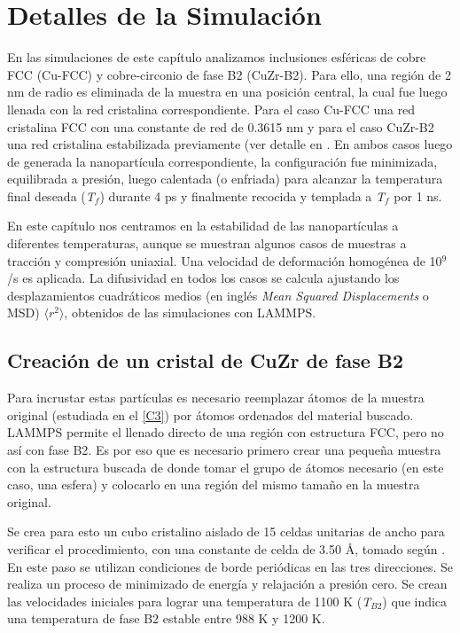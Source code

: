 
\section{Detalles de la Simulación}
\label{S4_1}

En las simulaciones de este capítulo analizamos inclusiones esféricas de cobre FCC (Cu-FCC) y cobre-circonio de fase B2 (CuZr-B2). Para ello, una región de 2 nm de radio es eliminada de la muestra en una posición central, la cual fue luego llenada con la red cristalina correspondiente. Para el caso Cu-FCC una red cristalina FCC con una constante de red de 0.3615 nm y para el caso CuZr-B2 una red cristalina estabilizada previamente (ver detalle en . En ambos casos luego de generada la nanopartícula correspondiente, la configuración fue minimizada, equilibrada a presión, luego calentada (o enfriada) para alcanzar la temperatura final deseada (\textit{T$_{f}$}) durante 4 ps y finalmente recocida y templada a \textit{T$_{f}$} por 1 ns.

En este capítulo nos centramos en la estabilidad de las nanopartículas a diferentes temperaturas, aunque se muestran algunos casos de muestras a tracción y compresión uniaxial. Una velocidad de deformación homogénea de 10$^{9}$/s es aplicada. La difusividad en todos los casos se calcula ajustando los desplazamientos cuadráticos medios (en inglés \textit{Mean Squared Displacements} o MSD) $\langle r^{2}\rangle$, obtenidos de las simulaciones con LAMMPS.

\subsection{Creación de un cristal de CuZr de fase B2}
\label{S4_1_1}

Para incrustar estas partículas es necesario reemplazar átomos de la muestra original (estudiada en el \cref{C3}) por átomos ordenados del material buscado. LAMMPS permite el llenado directo de una región con estructura FCC, pero no así con fase B2. Es por eso que es necesario  primero crear una pequeña muestra con la estructura buscada de donde tomar el grupo de átomos necesario (en este caso, una esfera) y colocarlo en una región del mismo tamaño en la muestra original.

Se crea para esto un cubo cristalino aislado de 15 celdas unitarias de ancho para verificar el procedimiento, con una constante de celda de 3.50 \AA{}, tomado según \cite{inoue04}. En este paso se utilizan condiciones de borde periódicas en las tres direcciones. Se realiza un proceso de minimizado de energía y relajación a presión cero. Se crean las velocidades iniciales para lograr una temperatura de 1100 K (\textit{T$_{B2}$}) \citep{pauly10} que indica una temperatura de fase B2 estable entre 988 K y 1200 K. 

